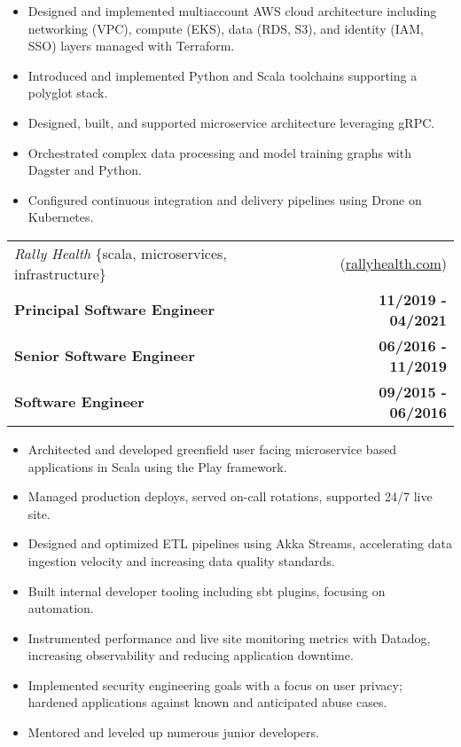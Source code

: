 \documentclass[10pt,letterpaper]{article}
\begin{document}
\begin{itemize}
  \item Designed and implemented multiaccount AWS cloud architecture including networking (VPC), \linebreak compute (EKS), data (RDS, S3), and identity (IAM, SSO) layers managed with Terraform.
\item Introduced and implemented Python and Scala toolchains supporting a polyglot stack.
\item Designed, built, and supported microservice architecture leveraging gRPC.
\item Orchestrated complex data processing and model training graphs with Dagster and Python.
\item Configured continuous integration and delivery pipelines using Drone on Kubernetes.
\end{itemize}

\vspace{0.25cm}


\noindent\begin{tabularx}{\textwidth}{@{} Xr @{}}
  \textit{Rally Health} \{scala, microservices, infrastructure\} & (\href{https://www.rallyhealth.com}{rallyhealth.com}) \\
  \textbf{Principal Software Engineer} & \textbf{11/2019 - 04/2021} \\
  \textbf{Senior Software Engineer} & \textbf{06/2016 - 11/2019} \\
  \textbf{Software Engineer} & \textbf{09/2015 - 06/2016} \\
\end{tabularx}

\begin{itemize}
\item Architected and developed greenfield user facing microservice based applications in \linebreak Scala using the Play framework.
\item Managed production deploys, served on-call rotations, supported 24/7 live site.
\item Designed and optimized ETL pipelines using Akka Streams, accelerating data ingestion \linebreak velocity and increasing data quality standards.
\item Built internal developer tooling including sbt plugins, focusing on automation.
\item Instrumented performance and live site monitoring metrics with Datadog, increasing \linebreak observability and reducing application downtime.
\item Implemented security engineering goals with a focus on user privacy; hardened \linebreak applications against known and anticipated abuse cases.
\item Mentored and leveled up numerous junior developers.
\end{itemize}
\end{document}
